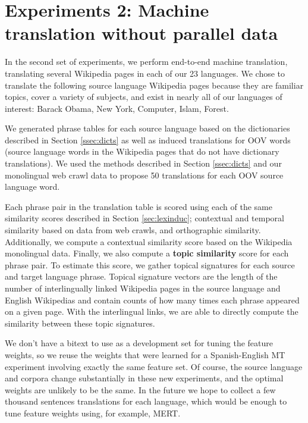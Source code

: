 \documentclass[11pt]{article}
\begin{document}





\section{Experiments 2: Machine translation without parallel data}\label{sec:mtwpd}
In the second set of experiments, we perform end-to-end machine translation, translating several Wikipedia pages in each of our 23 languages. We chose to translate the following source language Wikipedia pages because they are familiar topics, cover a variety of subjects, and exist in nearly all of our languages of interest: Barack Obama, New York, Computer, Islam, Forest. 

We generated phrase tables for each source language based on the dictionaries described in Section \ref{ssec:dicts} as well as induced translations for OOV words (source language words in the Wikipedia pages that do not have dictionary translations). We used the methods described in Section \ref{ssec:dicts} and our monolingual web crawl data to propose 50 translations for each OOV source language word.

Each phrase pair in the translation table is scored using each of the same similarity scores described in Section \ref{sec:lexinduc}; contextual and temporal similarity based on data from web crawls, and orthographic similarity. Additionally, we compute a contextual similarity score based on the Wikipedia monolingual data. Finally, we also compute a {\bf topic similarity} score for each phrase pair. To estimate this score, we gather topical signatures for each source and target language phrase. Topical signature vectors are the length of the number of interlingually linked Wikipedia pages in the source language and English Wikipedias and contain counts of how many times each phrase appeared on a given page. With the interlingual links, we are able to directly compute the similarity between these topic signatures. 

We don't have a bitext to use as a development set for tuning the feature weights, so we reuse the weights that were learned for a Spanish-English MT experiment involving exactly the same feature set. Of course, the source language and corpora change substantially in these new experiments, and the optimal weights are unlikely to be the same. In the future we hope to collect a few thousand sentences translations for each language, which would be enough to tune feature weights using, for example, MERT.
\end{document}
